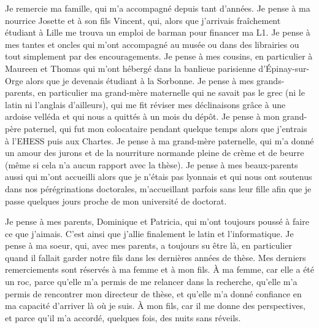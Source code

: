 Je remercie ma famille, qui m'a accompagné depuis tant d'années. Je pense à ma nourrice Josette et à son fils Vincent, qui, alors que j'arrivais fraîchement étudiant à Lille me trouva un emploi de barman pour financer ma L1. Je pense à mes tantes et oncles qui m'ont accompagné au musée ou dans des librairies ou tout simplement par des encouragements. Je pense à mes cousins, en particulier à Maureen et Thomas qui m'ont hébergé dans la banlieue parisienne d'Épinay-sur-Orge alors que je devenais étudiant à la Sorbonne. Je pense à mes grands-parents, en particulier ma grand-mère maternelle qui ne savait pas le grec (ni le latin ni l'anglais d'ailleurs), qui me fit réviser mes déclinaisons grâce à une ardoise velléda et qui nous a quittés à un mois du dépôt. Je pense à mon grand-père paternel, qui fut mon colocataire pendant quelque temps alors que j'entrais à l'EHESS puis aux Chartes. Je pense à ma grand-mère paternelle, qui m'a donné un amour des jurons et de la nourriture normande pleine de crème et de beurre (même si cela n'a aucun rapport avec la thèse). Je pense à mes beaux-parents aussi qui m'ont accueilli alors que je n'étais pas lyonnais et qui nous ont soutenus dans nos pérégrinations doctorales, m'accueillant parfois sans leur fille afin que je passe quelques jours proche de mon université de doctorat.

Je pense à mes parents, Dominique et Patricia, qui m'ont toujours poussé à faire ce que j'aimais. C'est ainsi que j'allie finalement le latin et l'informatique. Je pense à ma soeur, qui, avec mes parents, a toujours su être là, en particulier quand il fallait garder notre fils dans les dernières années de thèse. Mes derniers remerciements sont réservés à ma femme et à mon fils. À ma femme, car elle a été un roc, parce qu'elle m'a permis de me relancer dans la recherche, qu'elle m'a permis de rencontrer mon directeur de thèse, et qu'elle m'a donné confiance en ma capacité d'arriver là où je suis. À mon fils, car il me donne des perspectives, et parce qu'il m'a accordé, quelques fois, des nuits sans réveils.